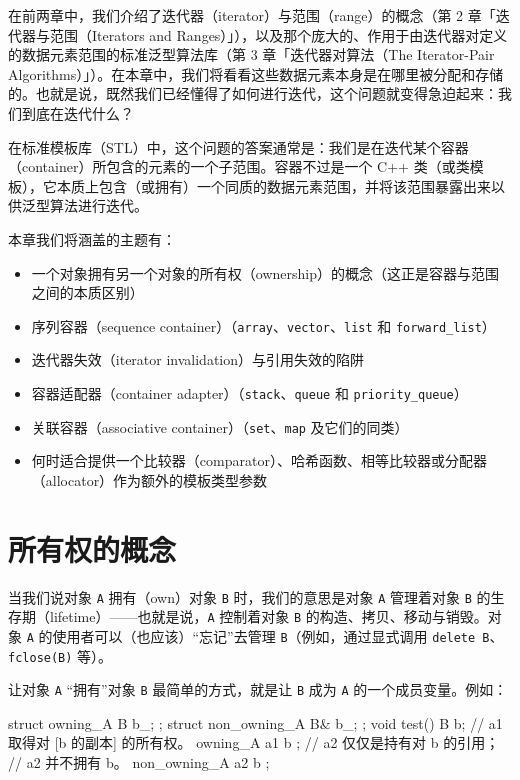 在前两章中，我们介绍了迭代器（iterator）与范围（range）的概念（第 2 章「迭代器与范围（Iterators and Ranges）」），以及那个庞大的、作用于由迭代器对定义的数据元素范围的标准泛型算法库（第 3 章「迭代器对算法（The Iterator-Pair Algorithms）」）。在本章中，我们将看看这些数据元素本身是在哪里被分配和存储的。也就是说，既然我们已经懂得了如何进行迭代，这个问题就变得急迫起来：我们到底在迭代什么？

在标准模板库（STL）中，这个问题的答案通常是：我们是在迭代某个容器（container）所包含的元素的一个子范围。容器不过是一个 C++ 类（或类模板），它本质上包含（或拥有）一个同质的数据元素范围，并将该范围暴露出来以供泛型算法进行迭代。

本章我们将涵盖的主题有：

\begin{itemize}
\item 一个对象拥有另一个对象的所有权（ownership）的概念（这正是容器与范围之间的本质区别）
\item 序列容器（sequence container）（\texttt{array}、\texttt{vector}、\texttt{list} 和 \texttt{forward\_\allowbreak{}list}）
\item 迭代器失效（iterator invalidation）与引用失效的陷阱
\item 容器适配器（container adapter）（\texttt{stack}、\texttt{queue} 和 \texttt{priority\_\allowbreak{}queue}）
\item 关联容器（associative container）（\texttt{set}、\texttt{map} 及它们的同类）
\item 何时适合提供一个比较器（comparator）、哈希函数、相等比较器或分配器（allocator）作为额外的模板类型参数
\end{itemize}

\section{所有权的概念}

当我们说对象 \texttt{A} 拥有（own）对象 \texttt{B} 时，我们的意思是对象 \texttt{A} 管理着对象 \texttt{B} 的生存期（lifetime）——也就是说，\texttt{A} 控制着对象 \texttt{B} 的构造、拷贝、移动与销毁。对象 \texttt{A} 的使用者可以（也应该）“忘记”去管理 \texttt{B}（例如，通过显式调用 \texttt{delete B}、\texttt{fclose(\allowbreak{}B)\allowbreak{}} 等）。

让对象 \texttt{A} “拥有”对象 \texttt{B} 最简单的方式，就是让 \texttt{B} 成为 \texttt{A} 的一个成员变量。例如：

\begin{codebox}[cpp]
    struct owning_A {
      B b_;
    };
    struct non_owning_A {
      B& b_;
    };
    void test()
    {
      B b;
      // a1 取得对 [b 的副本] 的所有权。
      owning_A a1 { b };
      // a2 仅仅是持有对 b 的引用；
      // a2 并不拥有 b。
      non_owning_A a2 { b };
    }
\end{codebox}

